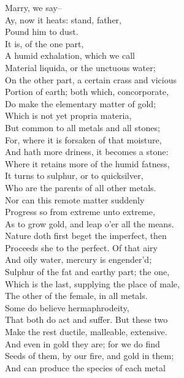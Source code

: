 \documentclass{memoir}
\begin{document}
\begin{drama*}
\subtlespeaks  Marry, we say--\\
\mammonspeaks {} Ay, now it heats: stand, father,\\
 Pound him to dust.\\
\subtlespeaks {} It is, of the one part,\\
 A humid exhalation, which we call\\
 Material liquida, or the unctuous water;\\
 On the other part, a certain crass and vicious\\
 Portion of earth; both which, concorporate,\\
 Do make the elementary matter of gold;\\
 Which is not yet propria materia,\\
 But common to all metals and all stones;\\
 For, where it is forsaken of that moisture,\\
 And hath more driness, it becomes a stone:\\
 Where it retains more of the humid fatness,\\
 It turns to sulphur, or to quicksilver,\\
 Who are the parents of all other metals.\\
 Nor can this remote matter suddenly\\
 Progress so from extreme unto extreme,\\
 As to grow gold, and leap o'er all the means.\\
 Nature doth first beget the imperfect, then\\
 Proceeds she to the perfect. Of that airy\\
 And oily water, mercury is engender'd;\\
 Sulphur of the fat and earthy part; the one,\\
 Which is the last, supplying the place of male,\\
 The other of the female, in all metals.\\
 Some do believe hermaphrodeity,\\
 That both do act and suffer. But these two\\
 Make the rest ductile, malleable, extensive.\\
 And even in gold they are; for we do find\\
 Seeds of them, by our fire, and gold in them;\\
 And can produce the species of each metal\\

\end{drama*}
\end{document}

